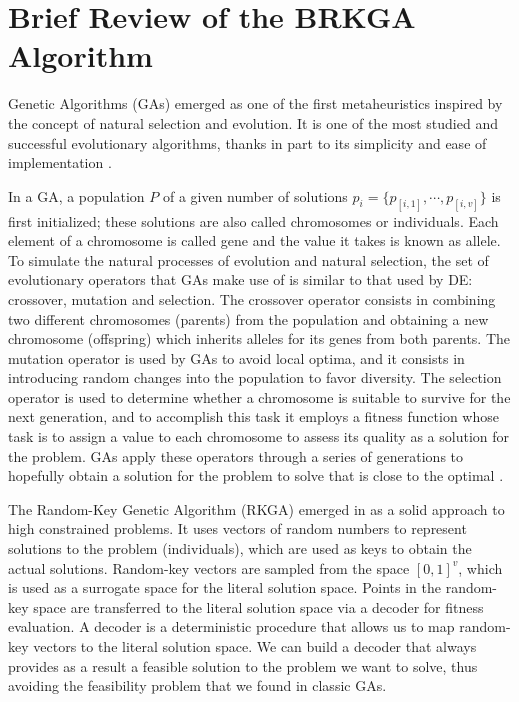 \documentclass[review]{elsarticle}
\begin{document}
\section{Brief Review of the BRKGA Algorithm} \label{sec:brkga}

Genetic Algorithms (GAs) emerged as one of the first metaheuristics inspired by the concept of natural selection and evolution. It is one of the most studied and successful evolutionary algorithms, thanks in part to its simplicity and ease of implementation \cite{goldberg1989genetic, fausto2019ants}. 

In a GA, a population $P$ of a given number of solutions $p_i = \{p_{[i,1]}, \cdots, p_{[i,v]}\}$ is first initialized; these solutions are also called chromosomes or individuals. Each element of a chromosome is called gene and the value it takes is known as allele. To simulate the natural processes of evolution and natural selection, the set of evolutionary operators that GAs make use of is similar to that used by DE: crossover, mutation and selection. The crossover operator consists in combining two different chromosomes (parents) from the population and obtaining a new chromosome (offspring) which inherits alleles for its genes from both parents. The mutation operator is used by GAs to avoid local optima, and it consists in introducing random changes into the population to favor diversity. The selection operator is used to determine whether a chromosome is suitable to survive for the next generation, and to accomplish this task it employs a fitness function whose task is to assign a value to each chromosome to assess its quality as a solution for the problem. GAs apply these operators through a series of generations to hopefully obtain a solution for the problem to solve that is close to the optimal \cite{fausto2019ants}. 


The Random-Key Genetic Algorithm (RKGA) emerged in \cite{bean1994genetic} as a solid approach to high constrained problems. It uses vectors of random numbers to represent solutions to the problem (individuals), which are used as keys to obtain the actual solutions. Random-key vectors are sampled from the space $[0,1]^{v}$, which is used as a surrogate space for the literal solution space. Points in the random-key space are transferred to the literal solution space via a decoder for fitness evaluation. A decoder is a deterministic procedure that allows us to map random-key vectors to the literal solution space. We can build a decoder that always provides as a result a feasible solution to the problem we want to solve, thus avoiding the feasibility problem that we found in classic GAs.
\end{document}
